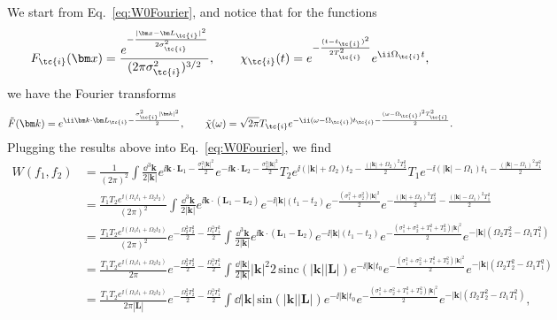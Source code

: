 We start from Eq.~\eqref{eq:W0Fourier}, and notice that for the functions
\begin{equation}
    F_\tc{i}(\bm x) = \frac{e^{-\frac{|\bm x - \bm L_\tc{i}|^2}{2 \sigma_\tc{i}^2}}}{(2\pi \sigma_\tc{i}^2)^{3/2}}, \quad \quad \chi_\tc{i}(t) = e^{- \frac{(t-t_\tc{i})^2}{2T_\tc{i}^2}}e^{\ii \Omega_\tc{i} t},
\end{equation}
we have the Fourier transforms
\begin{equation}
    \tilde{F}(\bm k) = e^{\ii \bm k \cdot \bm L_\tc{i} - \frac{\sigma_\tc{i}^2 |\bm k|^2}{2}}, \quad \quad \tilde{\chi}(\omega) = \sqrt{2 \pi} T_\tc{i} e^{-\ii (\omega-\Omega_\tc{i}) t_\tc{i} - \frac{(\omega-\Omega_\tc{i})^2 T_\tc{i}^2}{2}}.
\end{equation}
Plugging the results above into Eq.~\eqref{eq:W0Fourier}, we find{\footnotesize
\begin{align}
    W(f_1,f_2) &= \frac{1}{(2\pi)^2} \int \frac{\dd^3\bm k}{2 |\bm k|} e^{\ii \bm k \cdot \bm L_1 - \frac{\sigma_1^2 |\bm k|^2}{2}} e^{-\ii \bm k \cdot \bm L_2 - \frac{\sigma_2^2 |\bm k|^2}{2}} T_2 e^{\ii (|\bm k|+\Omega_2) t_2 - \frac{(|\bm k|+\Omega_2)^2 T_2^2}{2}} T_1 e^{-\ii (|\bm k|-\Omega_1) t_1 - \frac{(|\bm k|-\Omega_1)^2 T_1^2}{2}}\nonumber\\
    &= \frac{T_1T_2e^{\ii (\Omega_1 t_1+\Omega_2 t_2)}}{(2\pi)^2} \int \frac{\dd^3\bm k}{2 |\bm k|} e^{\ii \bm k \cdot (\bm L_1 - \bm L_2)} e^{-\ii |\bm k|( t_1-t_2)}e^{ - \frac{(\sigma_1^2+\sigma_2^2) |\bm k|^2}{2}}   e^{- \frac{(|\bm k|+\Omega_2)^2 T_2^2}{2} - \frac{(|\bm k|-\Omega_1)^2 T_1^2}{2}} \nonumber\\
    &= \frac{T_1T_2e^{\ii (\Omega_1 t_1+\Omega_2 t_2)}}{(2\pi)^2} e^{- \frac{\Omega_2^2 T_2^2}{2} - \frac{\Omega_1^2 T_1^2}{2}}\int \frac{\dd^3\bm k}{2 |\bm k|} e^{\ii \bm k \cdot (\bm L_1 - \bm L_2)} e^{-\ii |\bm k|( t_1-t_2)}e^{ - \frac{(\sigma_1^2+\sigma_2^2+T_1^2 + T_2^2) |\bm k|^2}{2}}    e^{- |\bm k| (\Omega_2 T_2^2-\Omega_1 T_1^2)}\nonumber
    \\
    &= \frac{T_1T_2e^{\ii (\Omega_1 t_1+\Omega_2 t_2)}}{2\pi} e^{- \frac{\Omega_2^2 T_2^2}{2} - \frac{\Omega_1^2 T_1^2}{2}}\int \frac{\dd |\bm k|}{2 |\bm k|} |\bm k|^2 2 \,\text{sinc}(|\bm k|  |\bm L|) e^{-\ii |\bm k|t_0}e^{ - \frac{(\sigma_1^2+\sigma_2^2+T_1^2 + T_2^2) |\bm k|^2}{2}}    e^{- |\bm k| (\Omega_2 T_2^2-\Omega_1 T_1^2)}\nonumber\\
    &= \frac{T_1T_2e^{\ii (\Omega_1 t_1+\Omega_2 t_2)}}{2\pi|\bm L|} e^{- \frac{\Omega_2^2 T_2^2}{2} - \frac{\Omega_1^2 T_1^2}{2}}\int \dd |\bm k|\,\text{sin}(|\bm k|  |\bm L|) e^{-\ii |\bm k|t_0}e^{ - \frac{(\sigma_1^2+\sigma_2^2+T_1^2 + T_2^2) |\bm k|^2}{2}}    e^{- |\bm k| (\Omega_2 T_2^2-\Omega_1 T_1^2)},\label{eq:WfinalInt}
\end{align}}
